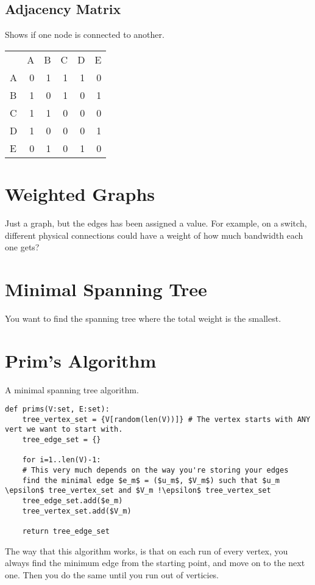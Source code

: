 \documentclass{article}
\begin{document}
\subsection{Adjacency Matrix}
\label{sec:org2b6fc5f}
Shows if one node is connected to another.
\begin{center}
\begin{tabular}{lrrrrr}
 & A & B & C & D & E\\
A & 0 & 1 & 1 & 1 & 0\\
B & 1 & 0 & 1 & 0 & 1\\
C & 1 & 1 & 0 & 0 & 0\\
D & 1 & 0 & 0 & 0 & 1\\
E & 0 & 1 & 0 & 1 & 0\\
\end{tabular}
\end{center}

\section{Weighted Graphs}
\label{sec:org5272a3b}
Just a graph, but the edges has been assigned a value. For example, on a switch, different physical connections could have a weight of how much bandwidth each one gets?

\section{Minimal Spanning Tree}
\label{sec:org67615e0}
You want to find the spanning tree where the total weight is the smallest.

\section{Prim's Algorithm}
\label{sec:org806ece3}
A minimal spanning tree algorithm.
\begin{verbatim}
def prims(V:set, E:set):
    tree_vertex_set = {V[random(len(V))]} # The vertex starts with ANY vert we want to start with.
    tree_edge_set = {}

    for i=1..len(V)-1:
	# This very much depends on the way you're storing your edges
	find the minimal edge $e_m$ = ($u_m$, $V_m$) such that $u_m \epsilon$ tree_vertex_set and $V_m !\epsilon$ tree_vertex_set
	tree_edge_set.add($e_m)
	tree_vertex_set.add($V_m)

    return tree_edge_set
\end{verbatim}

The way that this algorithm works, is that on each run of every vertex, you always find the minimum edge from the starting point, and move on to the next one. Then you do the same until you run out of verticies.
\end{document}
